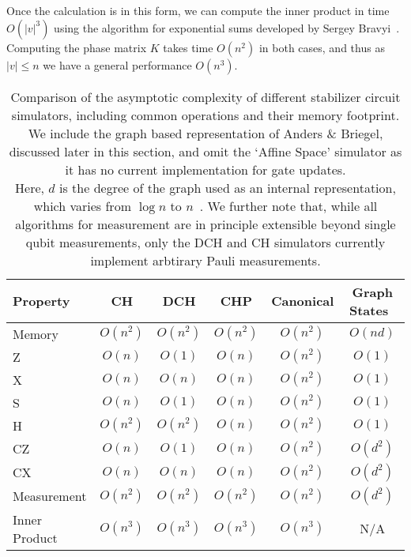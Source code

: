 Once the calculation is in this form, we can compute the inner product in time $O(\vert v\vert^{3})$ using the algorithm for exponential sums developed by Sergey Bravyi~\cite{Bravyi2018}. Computing the phase matrix $K$ takes time $O(n^{2})$ in both cases, and thus as $\vert v\vert\leq n$ we have a general performance $O(n^{3})$.
\begin{table}[t]
\centering
\begin{tabular}{|l|c|c|c|c|c|}
\hline
Property & CH & DCH & CHP & Canonical & Graph States~\cite{Anders2006} \\
\hline
Memory & $O(n^{2})$ & $O(n^{2})$ & $O(n^{2})$ & $O(n^{2})$ & $O(nd)$\\
\hline
Z & $O(n)$ & $O(1)$ & $O(n)$ & $O(n^{2})$ & $O(1)$\\
X & $O(n)$ & $O(n)$ & $O(n)$ & $O(n^{2})$ & $O(1)$\\
S & $O(n)$ & $O(1)$ & $O(n)$ & $O(n^{2})$ & $O(1)$\\
H & $O(n^{2})$ & $O(n^{2})$ & $O(n)$ & $O(n^{2})$ & $O(1)$\\
CZ & $O(n)$ & $O(1)$ & $O(n)$ & $O(n^{2})$ & $O(d^{2})$\\
CX & $O(n)$ & $O(n)$ & $O(n)$ & $O(n^{2})$ & $O(d^{2})$\\
Measurement & $O(n^{2})$ & $O(n^{2})$ & $O(n^{2})$ & $O(n^{2})$ & $O(d^{2})$\\
Inner Product & $O(n^{3})$ & $O(n^{3})$ & $O(n^{3})$ & $O(n^{3})$ & N/A \\
\hline
\end{tabular}
\caption{Comparison of the asymptotic complexity of different stabilizer circuit simulators, including common operations and their memory footprint. We include the graph based representation of Anders \& Briegel, discussed later in this section, and omit the `Affine Space' simulator as it has no current implementation for gate updates.\\ Here, $d$ is the degree of the graph used as an internal representation, which varies from $\log{n}$ to $n$~\cite{Anders2006}. We further note that, while all algorithms for measurement are in principle extensible beyond single qubit measurements, only the DCH and CH simulators currently implement arbtirary Pauli measurements.}
\label{tab:comparison}
\end{table}
